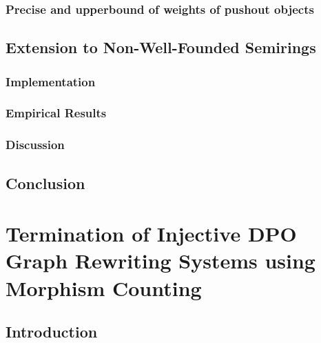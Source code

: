 \documentclass{report}
\begin{document}
\subsection{Precise and upperbound of weights of pushout objects} 
\label{sec:type_graph:wf:weighing_pushout} 
   

     
  
\section{Extension to Non-Well-Founded Semirings}
\label{sec:type_graph:extension_nwf}

 

\subsection{Implementation}
\label{nwf:sec:type_graph:implementation}
 

\subsection{Empirical Results}
\label{nwf:sec:type_graph:result}
 

\subsection{Discussion}
\label{nwf:sec:type_graph:related_work}


\section{Conclusion}
\label{nwf:sec:type_graph:conclusion}


\chapter{Termination of Injective DPO Graph Rewriting
Systems using Morphism Counting}
\label{chap:subgraph_counting}

\section{Introduction}
\label{subgraph_counting:sec:intro}

\end{document}
